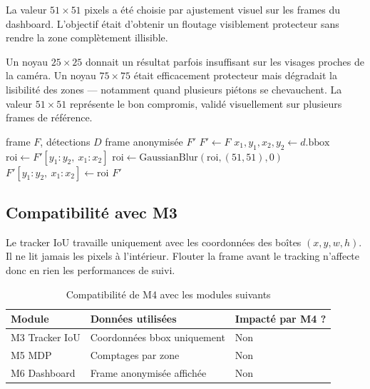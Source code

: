 La valeur $51 \times 51$ pixels a été
choisie par ajustement visuel sur les
frames du dashboard. L'objectif était
d'obtenir un floutage visiblement
protecteur sans rendre la zone
complètement illisible.

Un noyau $25 \times 25$ donnait un
résultat parfois insuffisant sur les
visages proches de la caméra. Un noyau
$75 \times 75$ était efficacement
protecteur mais dégradait la lisibilité
des zones — notamment quand plusieurs
piétons se chevauchent. La valeur
$51 \times 51$ représente le bon
compromis, validé visuellement sur
plusieurs frames de référence.

\begin{algorithm}[H]
\caption{Anonymisation M4 —
         Privacy-by-Design}
\begin{algorithmic}[1]
\REQUIRE frame $F$, détections $D$
\ENSURE frame anonymisée $F'$
\STATE $F' \leftarrow F$
    \STATE $x_1, y_1, x_2, y_2
      \leftarrow d.\text{bbox}$
    \STATE $\text{roi} \leftarrow
      F'[y_1:y_2,\ x_1:x_2]$
    \STATE $\text{roi} \leftarrow
      \text{GaussianBlur}(
      \text{roi}, (51, 51), 0)$
    \STATE $F'[y_1:y_2,\ x_1:x_2]
      \leftarrow \text{roi}$
  \ENDIF
\ENDFOR
\RETURN $F'$
\end{algorithmic}
\end{algorithm}

\subsection{Compatibilité avec M3}

Le tracker IoU travaille uniquement
avec les coordonnées des boîtes
$(x, y, w, h)$. Il ne lit jamais
les pixels à l'intérieur. Flouter
la frame avant le tracking n'affecte
donc en rien les performances de suivi.

\begin{table}[H]
\centering
\caption{Compatibilité de M4 avec
         les modules suivants}
\begin{tabularx}{\textwidth}{lXl}
\toprule
\textbf{Module} &
\textbf{Données utilisées} &
\textbf{Impacté par M4 ?} \\
\midrule
M3 Tracker IoU &
Coordonnées bbox uniquement &
Non \\
M5 MDP &
Comptages par zone &
Non \\
M6 Dashboard &
Frame anonymisée affichée &
Non \\
\bottomrule
\end{tabularx}
\label{tab:m4_compat}
\end{table}

